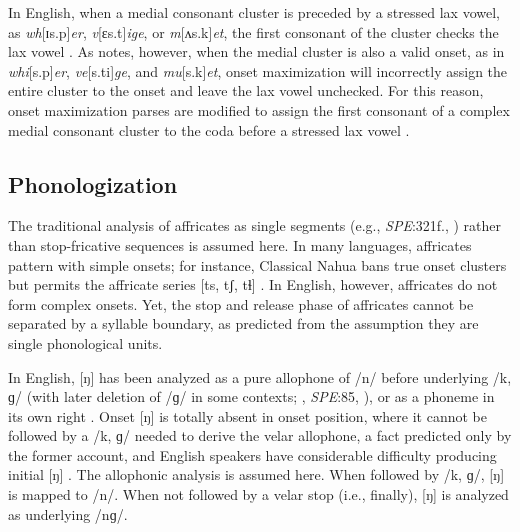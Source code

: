 \documentclass[12pt]{article}
\begin{document}
In English, when a medial consonant cluster is preceded by a stressed lax vowel, as \emph{wh}[ɪs.p]\emph{er}, \emph{v}[ɛs.t]\emph{ige}, or \emph{m}[ʌs.k]\emph{et}, the first consonant of the cluster checks the lax vowel \citep[3]{Hammond1997}. As \citet[55]{Harris1994} notes, however, when the medial cluster is also a valid onset, as in \emph{whi}[s.p]\emph{er}, \emph{ve}[s.ti]\emph{ge}, and \emph{mu}[s.k]\emph{et}, onset maximization will incorrectly assign the entire cluster to the onset and leave the lax vowel unchecked. For this reason, onset maximization parses are modified to assign the first consonant of a complex medial consonant cluster to the coda before a stressed lax vowel \citep[48]{Pulgram1970}.

\subsection{Phonologization}

The traditional analysis of affricates as single segments (e.g., \emph{SPE}:321f., \citealp[24]{Jakobson1961}) rather than stop-fricative sequences \citep[e.g.,][]{Hualde1988,Lombardi1990} is assumed here. In many languages, affricates pattern with simple onsets; for instance, Classical Nahua bans true onset clusters but permits the affricate series [ts, tʃ, tɬ] \citep[9]{Launey2011}. In English, however, affricates do not form complex onsets. Yet, the stop and release phase of affricates cannot be separated by a syllable boundary, as predicted from the assumption they are single phonological units.

In English, [ŋ] has been analyzed as a pure allophone of /n/ before underlying /k, ɡ/ (with later deletion of /ɡ/ in some contexts; \citealt[65f.]{Borowsky1986}, \emph{SPE}:85, \citealt[62]{Halle1985a}), or as a phoneme in its own right \citep[e.g.,][]{Jusczyk2002,Sapir1925}. Onset [ŋ] is totally absent in onset position, where it cannot be followed by a /k, ɡ/ needed to derive the velar allophone, a fact predicted only by the former account, and English speakers have considerable difficulty producing initial [ŋ] \citep{Rusaw2009}. The allophonic analysis is assumed here. When followed by /k, ɡ/, [ŋ] is mapped to /n/. When not followed by a velar stop (i.e., finally), [ŋ] is analyzed as underlying /nɡ/.

% 
% 



\end{document}
